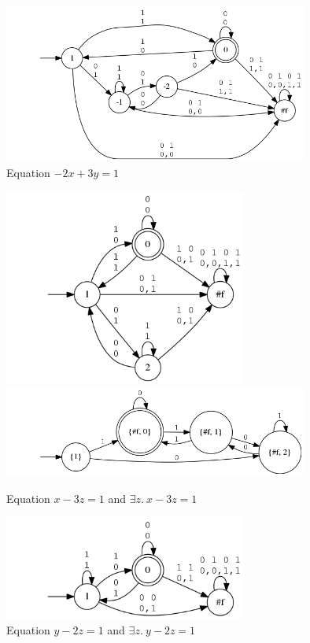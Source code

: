 \begin{example}
  \begin{figure}
    \label{left}
    \caption{Equation \( -2 x + 3y = 1 \)}
    \includegraphics[width=10cm]{images/eq5.png}
  \end{figure}
  \begin{figure}
    \label{rightleft}
    \caption{Equation \( x -3z = 1 \) and \( \exists z.\ x -3z = 1 \)}
    \includegraphics[width=8cm]{images/mod3is1_x.png}
    \includegraphics[width=10cm]{images/proj_mod3is1_x.png}
  \end{figure}
  \begin{figure}
    \label{rightright}
    \caption{Equation \( y -2z = 1 \) and \( \exists z.\ y -2z = 1 \)}
    \includegraphics[width=8cm]{images/odd_x.png}

\end{figure}
\end{example}
